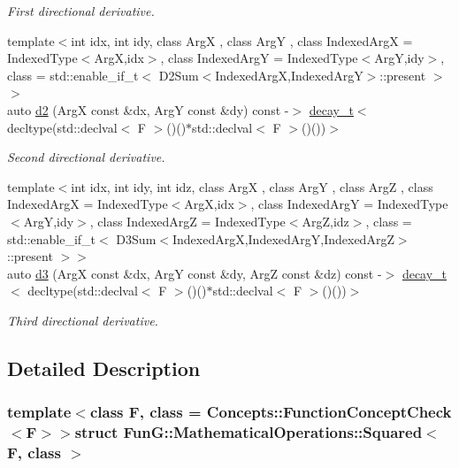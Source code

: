 \begin{DoxyCompactItemize}
\begin{DoxyCompactList}\small\item\em First directional derivative. \end{DoxyCompactList}\item 
{\footnotesize template$<$int idx, int idy, class Arg\-X , class Arg\-Y , class Indexed\-Arg\-X  = Indexed\-Type$<$\-Arg\-X,idx$>$, class Indexed\-Arg\-Y  = Indexed\-Type$<$\-Arg\-Y,idy$>$, class  = std\-::enable\-\_\-if\-\_\-t$<$ D2\-Sum$<$\-Indexed\-Arg\-X,\-Indexed\-Arg\-Y$>$\-::present $>$$>$ }\\auto \hyperlink{structFunG_1_1MathematicalOperations_1_1Squared_a242fd8a14c0fc68070e8beb7527968be}{d2} (Arg\-X const \&dx, Arg\-Y const \&dy) const -\/$>$ \hyperlink{namespaceFunG_a7ff91644f18a190ac3d4fc9e970ebe2e}{decay\-\_\-t}$<$ decltype(std\-::declval$<$ F $>$()()$\ast$std\-::declval$<$ F $>$()())$>$
\begin{DoxyCompactList}\small\item\em Second directional derivative. \end{DoxyCompactList}\item 
{\footnotesize template$<$int idx, int idy, int idz, class Arg\-X , class Arg\-Y , class Arg\-Z , class Indexed\-Arg\-X  = Indexed\-Type$<$\-Arg\-X,idx$>$, class Indexed\-Arg\-Y  = Indexed\-Type$<$\-Arg\-Y,idy$>$, class Indexed\-Arg\-Z  = Indexed\-Type$<$\-Arg\-Z,idz$>$, class  = std\-::enable\-\_\-if\-\_\-t$<$ D3\-Sum$<$\-Indexed\-Arg\-X,\-Indexed\-Arg\-Y,\-Indexed\-Arg\-Z$>$\-::present $>$$>$ }\\auto \hyperlink{structFunG_1_1MathematicalOperations_1_1Squared_a262e69cb557d5beb33f3d2c4da561215}{d3} (Arg\-X const \&dx, Arg\-Y const \&dy, Arg\-Z const \&dz) const -\/$>$ \hyperlink{namespaceFunG_a7ff91644f18a190ac3d4fc9e970ebe2e}{decay\-\_\-t}$<$ decltype(std\-::declval$<$ F $>$()()$\ast$std\-::declval$<$ F $>$()())$>$
\begin{DoxyCompactList}\small\item\em Third directional derivative. \end{DoxyCompactList}\end{DoxyCompactItemize}


\subsection{Detailed Description}
\subsubsection*{template$<$class F, class = Concepts\-::\-Function\-Concept\-Check$<$\-F$>$$>$struct Fun\-G\-::\-Mathematical\-Operations\-::\-Squared$<$ F, class $>$}

